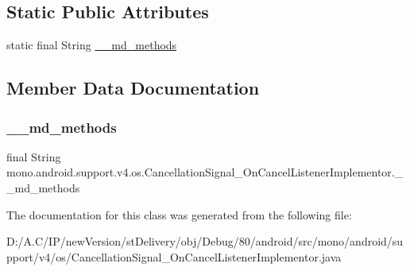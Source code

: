 \subsection*{Static Public Attributes}
\begin{DoxyCompactItemize}
\item 
static final String \hyperlink{classmono_1_1android_1_1support_1_1v4_1_1os_1_1_cancellation_signal___on_cancel_listener_implementor_a5eec9005f7084d8e489ea6fbe475df40}{\+\_\+\+\_\+md\+\_\+methods}
\end{DoxyCompactItemize}


\subsection{Member Data Documentation}
\mbox{\label{classmono_1_1android_1_1support_1_1v4_1_1os_1_1_cancellation_signal___on_cancel_listener_implementor_a5eec9005f7084d8e489ea6fbe475df40}} 
\subsubsection{\texorpdfstring{\+\_\+\+\_\+md\+\_\+methods}{\_\_md\_methods}}
{\footnotesize\ttfamily final String mono.\+android.\+support.\+v4.\+os.\+Cancellation\+Signal\+\_\+\+On\+Cancel\+Listener\+Implementor.\+\_\+\+\_\+md\+\_\+methods\hspace{0.3cm}{\ttfamily [static]}}



The documentation for this class was generated from the following file\+:\begin{DoxyCompactItemize}
\item 
D\+:/\+A.\+C/\+I\+P/new\+Version/st\+Delivery/obj/\+Debug/80/android/src/mono/android/support/v4/os/Cancellation\+Signal\+\_\+\+On\+Cancel\+Listener\+Implementor.\+java\end{DoxyCompactItemize}

